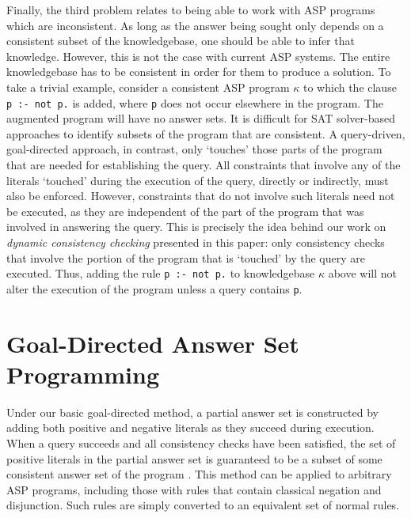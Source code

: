 \documentclass{new_tlp}
\begin{document}
Finally, the third problem relates to being able to work with ASP programs 
which are inconsistent. As long as the answer being sought only 
depends on a consistent subset of the knowledgebase, one should be able to 
infer that knowledge. However, this is not the case with current ASP systems. 
The entire knowledgebase has to be consistent in order for them to produce a 
solution. To take a trivial example, consider a consistent ASP program 
$\kappa$ to which the clause {\tt p :- not p.} 
is added, where {\tt p} does not occur elsewhere in the program. The augmented 
program will have no answer sets. It is difficult for 
SAT solver-based approaches to identify subsets of the program that are 
consistent. A query-driven, goal-directed approach, in contrast, only `touches'
those parts of the program that are needed for establishing the query. All
constraints that involve any of the literals `touched' during the execution of 
the query, directly or indirectly, must also be enforced. However, constraints 
that do not involve such literals need not be executed, as they are independent
of the part of the program that was involved in answering the query. This is
precisely the idea behind our work on {\it dynamic consistency checking}
presented in this paper: only consistency checks that involve the portion of
the program that is `touched' by the query are executed. Thus, adding the rule
{\tt p :- not p.} to knowledgebase $\kappa$ above will not alter the execution
of the program unless a query contains \texttt{p}.


\section{Goal-Directed Answer Set Programming} \label{sec:goaldir}

Under our basic goal-directed method, a partial answer set is constructed by 
adding both positive and negative literals as they succeed during execution. 
When a query succeeds and all consistency checks have been satisfied, the set 
of positive literals in the partial answer set is guaranteed to be a subset of 
some consistent answer set of the program \cite{goalasp}. This method can be 
applied to arbitrary ASP programs, including those with rules that contain 
classical negation and disjunction. Such rules are simply converted to an 
equivalent set of normal rules.
\end{document}
